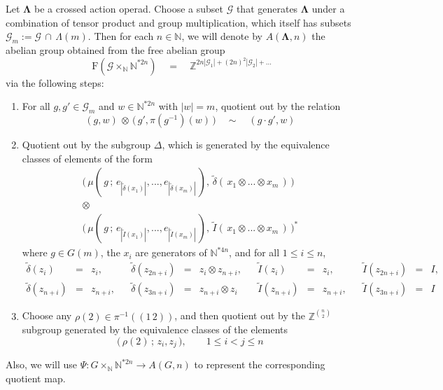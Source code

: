 \documentclass{amsbook} %
\newcommand{\ML}{\mathbf{\Lambda}}
\numberwithin{section}{chapter}
\begin{document}
\begin{Defi} \label{AGndef} Let $\ML$ be a crossed action operad. Choose a subset $\mathcal{G}$ that generates $\ML$ under a combination of tensor product and group multiplication, which itself has subsets $\mathcal{G}_m := \mathcal{G} \, \cap \, \Lambda(m)$. Then for each $n \in \mathbb{N}$, we will denote by $A(\ML,n)$ the abelian group obtained from the free abelian group 
\[ \mathrm{F}( \mathcal{G} \times_{\mathbb{N}} \mathbb{N}^{\ast 2n}) \quad = \quad \mathbb{Z}^{2n|\mathcal{G}_1| + (2n)^2|\mathcal{G}_2| + ...} \]
via the following steps:
\begin{enumerate}
\item For all $g, g' \in \mathcal{G}_m$ and $w \in \mathbb{N}^{\ast 2n}$ with $|w| = m$, quotient out by the relation 
\[ (g, w) \, \otimes \, \big( \, g', \pi(g^{-1})(w) \, \big) \quad \sim \quad (g \cdot g', w) \]
\item Quotient out by the subgroup $\Delta$, which is generated by the equivalence classes of elements of the form
\[ \begin{array}{c}
				\big( \, \mu( \, g \, ; \, e_{|\tilde{\delta}(x_1)|}, ..., e_{|\tilde{\delta}(x_m)|} \, ), \, \tilde{\delta}( \, x_1 \otimes ... \otimes x_m \, ) \, \big) \\
				\otimes \\
				\big( \, \mu( \, g \, ; \, e_{|\tilde{I}(x_1)|}, ..., e_{|\tilde{I}(x_m)|} \, ), \, \tilde{I}( \, x_1 \otimes ... \otimes x_m \, ) \, \big)^*
		\end{array} 
\]
where $g \in G(m)$, the $x_i$ are generators of $\mathbb{N}^{\ast 4n}$, and for all $1 \le i \le n$,
\[ \begin{array}{rclcrclcrclcrcl}
			\tilde{\delta}(z_i) & = & z_i, & & \tilde{\delta}(z_{2n+i}) & = & z_i \otimes z_{n+i}, & & \tilde{I}(z_i) & = & z_i, & &\tilde{I}(z_{2n+i}) & = & I,\\
			\tilde{\delta}(z_{n+i}) & = & z_{n+i}, &  & \tilde{\delta}(z_{3n+i}) & = & z_{n+i} \otimes z_i & & \tilde{I}(z_{n+i}) & = & z_{n+i}, & & \tilde{I}(z_{3n+i}) & = & I
			 \end{array}
\] 
\item Choose any $\rho(2) \in \pi^{-1}((1 \, 2))$, and then quotient out by the $\mathbb{Z}^{{n}\choose{2}}$ subgroup generated by the equivalence classes of the elements 
\[ \big( \, \rho(2) \, ; \, z_i, z_j \, \big), \quad \quad 1 \le i < j \le n \]
\end{enumerate}
Also, we will use $\Psi: G \times_{\mathbb{N}} \mathbb{N}^{\ast 2n} \to A(G,n)$ to represent the corresponding quotient map. 
\end{Defi}
\end{document}

